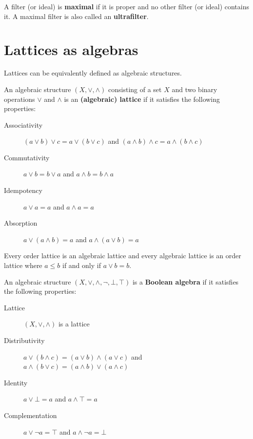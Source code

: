\documentclass{bareminimum}
\begin{document}
\begin{defn}
	A filter (or ideal)  is \textbf{maximal} if it is proper and no other filter (or ideal) contains it. A maximal filter is also called an \textbf{ultrafilter}.
\end{defn}

\section{Lattices as algebras}

Lattices can be equivalently defined as algebraic structures.

\begin{defn}
	An algebraic  structure $(X, \vee, \wedge)$ consisting of a set $X$ and two binary operations $\vee$ and $\wedge$ is an \textbf{(algebraic) lattice} if it satisfies the following properties:
	\begin{description}
		\item[Associativity] $(a \vee b) \vee c = a \vee (b \vee c)$
		and $(a \wedge b) \wedge c = a \wedge (b \wedge c)$
		\item[Commutativity] $a \vee b = b \vee a$
		and $a \wedge b = b \wedge a$
		\item[Idempotency] $a \vee a = a$
		and $a \wedge a = a$
		\item[Absorption] $a \vee (a \wedge b) = a$
		and $a \wedge (a \vee b) = a$
	\end{description}
\end{defn}

\begin{prop}
	Every order lattice is an algebraic lattice and every algebraic lattice is an order lattice where $a \leq b$ if and only if $a \vee b = b$.
\end{prop}

\begin{defn}
	An algebraic  structure $(X, \vee, \wedge, \neg, \bot, \top)$ is a \textbf{Boolean algebra} if it satisfies the following properties:
	\begin{description}
		\item[Lattice] $(X, \vee, \wedge)$ is a lattice
		\item[Distributivity] $a \vee (b \wedge c) = (a \vee b) \wedge (a \vee c)$
and $a \wedge (b \vee c) = (a \wedge b) \vee (a \wedge c)$
		\item[Identity] $a \vee \bot = a$
		and $a \wedge \top = a$
		\item[Complementation] $a \vee \neg a = \top$
		and $a \wedge \neg a = \bot$
	\end{description}
\end{defn}
\end{document}

